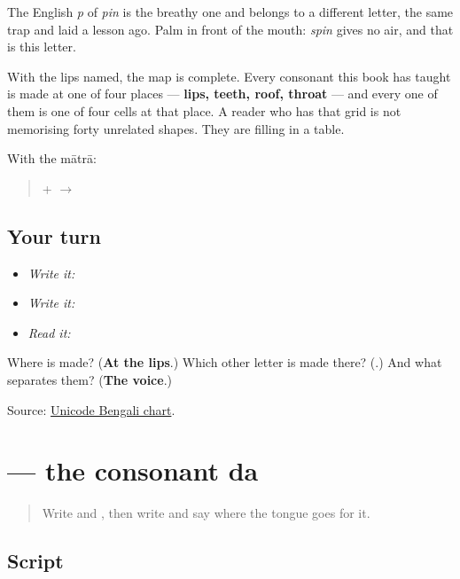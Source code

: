 The English \emph{p} of \emph{pin} is the breathy one and belongs to a different letter, the same trap \textbf{} and \textbf{} laid a lesson ago. Palm in front of the mouth: \emph{spin} gives no air, and that is this letter.

With the lips named, the map is complete. Every consonant this book has taught is made at one of four places — \textbf{lips, teeth, roof, throat} — and every one of them is one of four cells at that place. A reader who has that grid is not memorising forty unrelated shapes. They are filling in a table.

With the mātrā:

\begin{quote}
\textbf{} + \textbf{} $\to$ \textbf{}
\end{quote}

\subsection*{Your turn}
\begin{itemize}
\raggedright
  \item \emph{Write it:} 
  \item \emph{Write it:}  
  \item \emph{Read it:} 
\end{itemize}

\begin{tcolorbox}[breakable,colback=teal!4,colframe=teal!35!black,title={Before you move on}]
Where is \textbf{} made? (\textbf{At the lips}.) Which other letter is made there? (\textbf{}.) And what separates them? (\textbf{The voice}.)

Source: \href{https://www.unicode.org/charts/PDF/U0980.pdf}{Unicode Bengali chart}.
\end{tcolorbox}
\section[\texorpdfstring{\bn{দ} (dô)}{দ (dô)}]{ — the consonant da}

\label{lesson:BN-W03-da}



\begin{quote}
Write \textbf{} and \textbf{}, then write \textbf{} and say where the tongue goes for it.
\end{quote}

\subsection*{Script}

